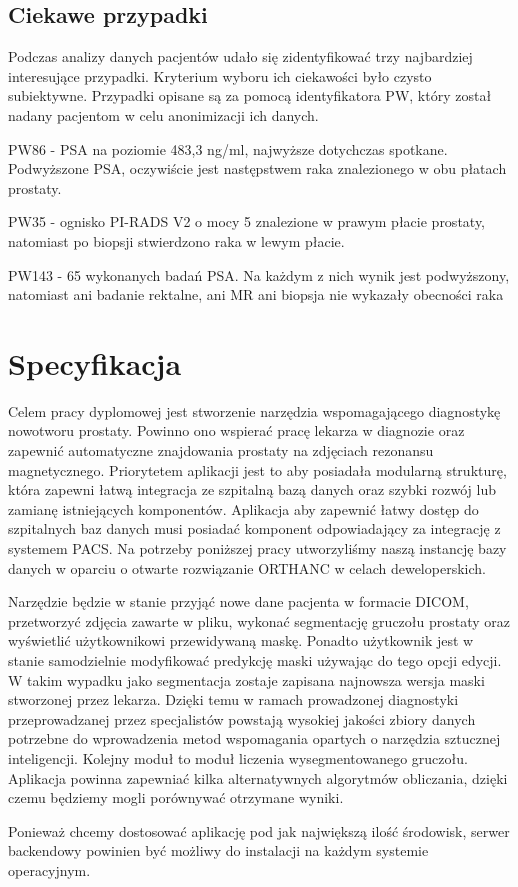\documentclass[a4paper,11pt,twoside]{report}
\theoremstyle{definition}
\begin{document}
\section{Ciekawe przypadki}
Podczas analizy danych pacjentów udało się zidentyfikować trzy najbardziej interesujące przypadki. Kryterium wyboru ich ciekawości było czysto subiektywne. Przypadki opisane są za pomocą identyfikatora PW, który został nadany pacjentom w celu anonimizacji ich danych.
\par
\begin{description}
\item  PW86 - PSA na poziomie 483,3 ng/ml, najwyższe dotychczas spotkane. Podwyższone PSA, oczywiście jest następstwem raka znalezionego w obu płatach prostaty.
\item  PW35 - ognisko PI-RADS V2 o mocy 5 znalezione w prawym płacie prostaty, natomiast po biopsji stwierdzono raka w lewym płacie.
\item  PW143 - 65 wykonanych badań PSA. Na każdym z nich wynik jest podwyższony, natomiast ani badanie rektalne, ani MR ani biopsja nie wykazały obecności raka
\end{description}


\chapter{Specyfikacja} %

Celem pracy dyplomowej jest stworzenie narzędzia wspomagającego diagnostykę nowotworu prostaty. Powinno ono wspierać pracę lekarza w diagnozie oraz zapewnić automatyczne znajdowania prostaty na zdjęciach rezonansu magnetycznego. Priorytetem aplikacji jest to aby posiadała modularną strukturę, która zapewni łatwą integracja ze szpitalną bazą danych oraz szybki rozwój lub zamianę istniejących komponentów. Aplikacja aby zapewnić łatwy dostęp do szpitalnych baz danych musi posiadać komponent odpowiadający za integrację z systemem PACS. Na potrzeby poniższej pracy utworzyliśmy naszą instancję bazy danych w oparciu o otwarte rozwiązanie ORTHANC \cite{Orthanc} w celach deweloperskich.
\par
Narzędzie będzie w stanie przyjąć nowe dane pacjenta w formacie DICOM, przetworzyć zdjęcia zawarte w pliku, wykonać segmentację gruczołu prostaty oraz wyświetlić użytkownikowi przewidywaną maskę. Ponadto użytkownik jest w stanie samodzielnie modyfikować predykcję maski używając do tego opcji edycji. W takim wypadku jako segmentacja zostaje zapisana najnowsza wersja maski stworzonej przez lekarza. Dzięki temu w ramach prowadzonej diagnostyki przeprowadzanej przez specjalistów powstają wysokiej jakości zbiory danych potrzebne do wprowadzenia metod wspomagania opartych o narzędzia sztucznej inteligencji. Kolejny moduł to moduł liczenia wysegmentowanego gruczołu. Aplikacja powinna zapewniać kilka alternatywnych algorytmów obliczania, dzięki czemu będziemy mogli porównywać otrzymane wyniki.
\par
Ponieważ chcemy dostosować aplikację pod jak największą ilość środowisk, serwer backendowy powinien być możliwy do instalacji na każdym systemie operacyjnym.
\end{document}
